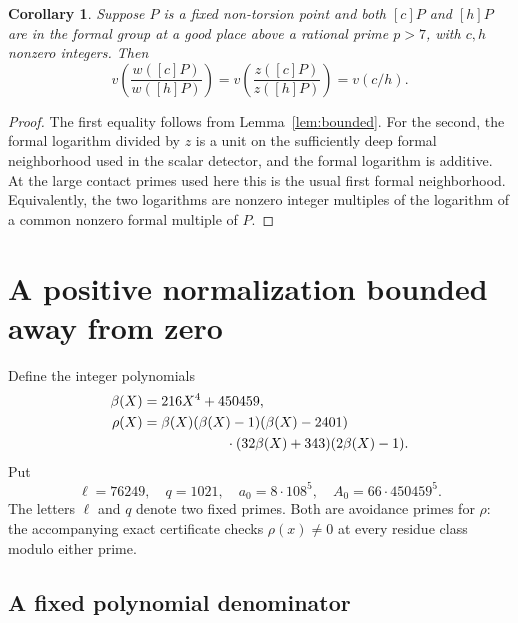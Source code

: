 \documentclass[11pt]{article}
\newtheorem{corollary}[theorem]{Corollary}
\theoremstyle{remark}\newtheorem{remark}[theorem]{Remark}
\begin{document}
\begin{corollary}\label{cor:ratio}
Suppose $P$ is a fixed non-torsion point and both $[c]P$ and
$[h]P$ are in the formal group at a good place above a rational prime $p>7$,
with $c,h$ nonzero
integers.  Then
\[
 v\!\left(\frac{w([c]P)}{w([h]P)}\right)
 =v\!\left(\frac{z([c]P)}{z([h]P)}\right)=v(c/h).
\]
\end{corollary}
\begin{proof}
The first equality follows from Lemma~\ref{lem:bounded}.
For the second, the formal logarithm divided by $z$ is a unit
on the sufficiently deep formal neighborhood used in the scalar
detector, and the formal logarithm is additive.  At the large
contact primes used here this is the usual first formal neighborhood.
Equivalently, the two logarithms are nonzero integer multiples
of the logarithm of a common nonzero formal multiple of $P$.
\end{proof}

\section{A positive normalization bounded away from zero}

Define the integer polynomials
\[
 \begin{split}
  \beta(X)&=216X^4+450459,\\
  \rho(X)&=\beta(X)(\beta(X)-1)(\beta(X)-2401)\\
   &\hspace{21mm}\cdot(32\beta(X)+343)(2\beta(X)-1).
 \end{split}
\]
Put
\[
 \ell=76249,\quad q=1021,\quad a_0=8\cdot108^5,\quad
 A_0=66\cdot450459^5.
\]
The letters $\ell$ and $q$ denote two fixed primes.  Both are
avoidance primes for $\rho$: the accompanying exact certificate
checks $\rho(x)\ne0$ at every residue class modulo either prime.

\subsection{A fixed polynomial denominator}
\end{document}
